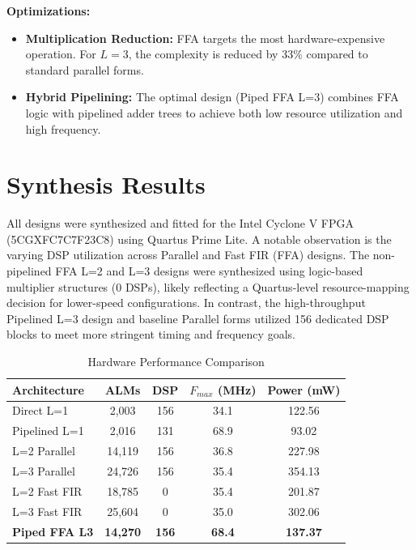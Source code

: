 \documentclass[12pt]{article}
\begin{document}
\textbf{Optimizations:}
\begin{itemize}
    \item \textbf{Multiplication Reduction:} FFA targets the most hardware-expensive operation. For $L=3$, the complexity is reduced by 33\% compared to standard parallel forms.
    \item \textbf{Hybrid Pipelining:} The optimal design (Piped FFA L=3) combines FFA logic with pipelined adder trees to achieve both low resource utilization and high frequency.
\end{itemize}


\section{Synthesis Results}
All designs were synthesized and fitted for the Intel Cyclone V FPGA (5CGXFC7C7F23C8) using Quartus Prime Lite. A notable observation is the varying DSP utilization across Parallel and Fast FIR (FFA) designs. The non-pipelined FFA L=2 and L=3 designs were synthesized using logic-based multiplier structures (0 DSPs), likely reflecting a Quartus-level resource-mapping decision for lower-speed configurations. In contrast, the high-throughput Pipelined L=3 design and baseline Parallel forms utilized 156 dedicated DSP blocks to meet more stringent timing and frequency goals.

\begin{table}[H]
\centering
\caption{Hardware Performance Comparison}
\begin{tabular}{@{}lcccc@{}}
\toprule
\textbf{Architecture} & \textbf{ALMs} & \textbf{DSP} & \textbf{$F_{max}$ (MHz)} & \textbf{Power (mW)} \\ \midrule
Direct L=1            & 2,003         & 156          & 34.1                     & 122.56              \\
Pipelined L=1         & 2,016         & 131          & 68.9                     & 93.02               \\
L=2 Parallel          & 14,119        & 156          & 36.8                     & 227.98              \\
L=3 Parallel          & 24,726        & 156          & 35.4                     & 354.13              \\
L=2 Fast FIR          & 18,785        & 0            & 35.4                     & 201.87              \\
L=3 Fast FIR          & 25,604        & 0            & 35.0                     & 302.06              \\
\textbf{Piped FFA L3} & \textbf{14,270} & \textbf{156} & \textbf{68.4}            & \textbf{137.37}     \\ \bottomrule
\end{tabular}
\end{table}
\end{document}
